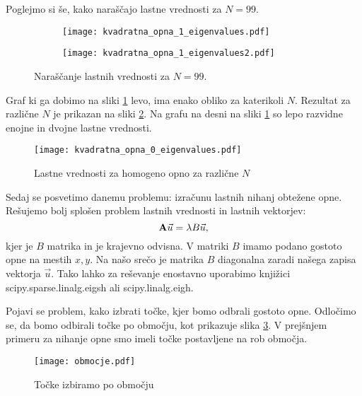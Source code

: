 \documentclass[12pt,a4paper]{article}
\begin{document}
Poglejmo si še, kako naraščajo lastne vrednosti za $N=99$.

\begin{figure}[H]
    \centering
    \begin{subfigure}[b]{0.49\textwidth}
        \texttt{[image: kvadratna\_opna\_1\_eigenvalues.pdf]}
    \end{subfigure}
    \begin{subfigure}[b]{0.49\textwidth}
        \texttt{[image: kvadratna\_opna\_1\_eigenvalues2.pdf]}
    \end{subfigure}
    \caption{Naraščanje  lastnih vrednosti za $N=99$.} \label{fig:slika6}
\end{figure}
\noindent Graf ki ga dobimo na sliki \ref{fig:slika6} levo, ima enako obliko za katerikoli $N$. Rezultat za različne $N$ je prikazan na sliki \ref{fig:slika7}. Na grafu na desni na sliki \ref{fig:slika6} so lepo razvidne enojne in dvojne lastne vrednosti.

\begin{figure}[H]
\begin{center}
\texttt{[image: kvadratna\_opna\_0\_eigenvalues.pdf]}
\caption{Lastne vrednosti za homogeno opno za različne $N$ } \label{fig:slika7}
\end{center}
\end{figure}


Sedaj se posvetimo danemu problemu: izračunu lastnih nihanj obtežene opne. Rešujemo bolj splošen problem lastnih vrednosti in lastnih vektorjev:
\begin{equation}
\textbf{\textrm{A}} \vec{u}= \lambda B \vec{u},
\end{equation}
kjer je $B$ matrika in je krajevno odvisna. V matriki $B$ imamo podano gostoto opne na mestih $x,y$. Na našo srečo je matrika $B$ diagonalna zaradi našega zapisa vektorja $\vec{u}$. Tako lahko za reševanje enostavno uporabimo knjižici \textsf{scipy.sparse.linalg.eigsh} ali \textsf{scipy.linalg.eigh}.

Pojavi se problem, kako izbrati točke, kjer bomo odbrali gostoto opne. Odločimo se, da bomo odbirali točke po območju, kot prikazuje slika \ref{fig:slika8}. V prejšnjem primeru za nihanje opne smo imeli točke postavljene na rob območja. 

\begin{figure}[H]
\begin{center}
\texttt{[image: obmocje.pdf]}
\caption{Točke izbiramo po območju} \label{fig:slika8}
\end{center}
\end{figure}
\end{document}
